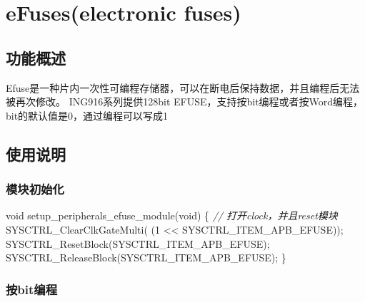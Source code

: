 \documentclass[
  12pt,
]{book}
\newenvironment{Shaded}{\begin{snugshade}}{\end{snugshade}}
\newcommand{\CommentTok}[1]{\textcolor[rgb]{0.56,0.35,0.01}{\textit{#1}}}
\newcommand{\DataTypeTok}[1]{\textcolor[rgb]{0.13,0.29,0.53}{#1}}
\newcommand{\DecValTok}[1]{\textcolor[rgb]{0.00,0.00,0.81}{#1}}
\newcommand{\NormalTok}[1]{#1}
\begin{document}
\hypertarget{efuseselectronic-fuses}{%
\chapter{eFuses(electronic fuses)}\label{efuseselectronic-fuses}}

\hypertarget{ux529fux80fdux6982ux8ff0}{%
\section{功能概述}\label{ux529fux80fdux6982ux8ff0}}

Efuse是一种片内一次性可编程存储器，可以在断电后保持数据，并且编程后无法被再次修改。 ING916系列提供128bit EFUSE，支持按bit编程或者按Word编程，bit的默认值是0，通过编程可以写成1

\hypertarget{ux4f7fux7528ux8bf4ux660e}{%
\section{使用说明}\label{ux4f7fux7528ux8bf4ux660e}}

\hypertarget{ux6a21ux5757ux521dux59cbux5316}{%
\subsection{模块初始化}\label{ux6a21ux5757ux521dux59cbux5316}}

\begin{Shaded}
\begin{Highlighting}[]
\DataTypeTok{void}\NormalTok{ setup_peripherals_efuse_module(}\DataTypeTok{void}\NormalTok{)}
\NormalTok{\{}
    \CommentTok{// 打开clock，并且reset模块}
\NormalTok{    SYSCTRL_ClearClkGateMulti( (}\DecValTok{1}\NormalTok{ << SYSCTRL_ITEM_APB_EFUSE));}
\NormalTok{    SYSCTRL_ResetBlock(SYSCTRL_ITEM_APB_EFUSE);}
\NormalTok{    SYSCTRL_ReleaseBlock(SYSCTRL_ITEM_APB_EFUSE);}
\NormalTok{\}}
\end{Highlighting}
\end{Shaded}

\hypertarget{ux6309bitux7f16ux7a0b}{%
\subsection{按bit编程}\label{ux6309bitux7f16ux7a0b}}
\end{document}
